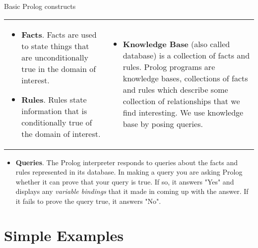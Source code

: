 \begin{frame}
	\frametitle{\insertsection}
	Basic Prolog constructs
	\begin{tabular}{p{}p{}}
		\begin{itemize}
			\item \textbf{Facts}. Facts are used to state things that are unconditionally true in the domain of interest.
			\item \textbf{Rules}. Rules state information that is conditionally true of the domain of interest.
		\end{itemize}
		&
		\begin{itemize}
			\item[] \textbf{Knowledge Base} (also called database) is a collection of facts and rules. Prolog programs are knowledge
			bases, collections of facts and rules which describe some collection of relationships that we find interesting. We use knowledge base
			by posing queries.
		\end{itemize}
	\end{tabular}
	\begin{itemize}
		\item \textbf{Queries}. The Prolog interpreter responds to queries about the facts and rules represented in its database. In making a query you are asking Prolog whether it can prove that your query is true. If so, it answers "Yes" and displays any \textit{variable bindings} that it made in coming up with the answer. If it fails to prove the query true, it answers "No".
	\end{itemize}
\end{frame}

\section{Simple Examples}


